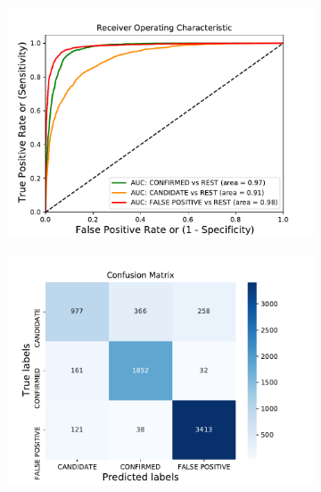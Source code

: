 \begin{figure}[H]
                \begin{mdframed}[linecolor=green]
                \centering
                \begin{subfigure}{.49\textwidth}
                \includegraphics[width = 1\textwidth]{data/LR_overfit_roc.pdf}
                \end{subfigure}
                \begin{subfigure}{.49\textwidth}
                \includegraphics[width = 1\textwidth]{data/LR_overfit_cm.pdf}
                \end{subfigure}
                \begin{subfigure}{.49\textwidth}

\end{subfigure}
\end{mdframed}
\end{figure}
